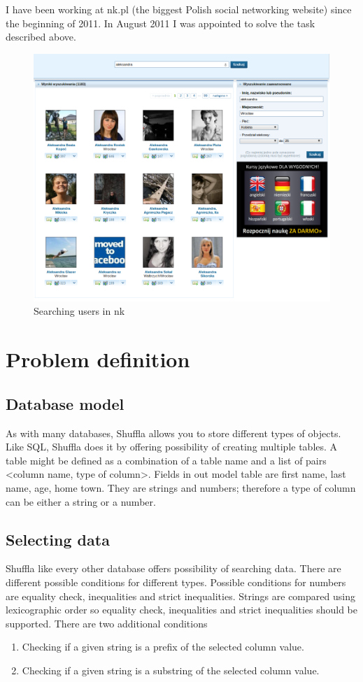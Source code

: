 \documentclass[10pt,a4paper]{article}
\begin{document}
I have been working at nk.pl (the biggest Polish social networking website) since the beginning of 2011. In August 2011 I was appointed to solve the task described above. 

\begin{figure}[h!]
\centering
  \includegraphics[width=12cm]{nk_search}
  \caption{Searching users in nk}
  \label{fig:nk_search}
\end{figure}

\section{Problem definition}

\subsection{Database model}

As with many databases, Shuffla allows you to store different types of objects. Like SQL, Shuffla does it by offering possibility of creating multiple tables. A table might be defined as a combination of a table name and a list of pairs <column name, type of column>. Fields in out model table are first name, last name, age, home town. They are strings and numbers; therefore a type of column can be either a string or a number.

\subsection{Selecting data}

Shuffla like every other database offers possibility of searching data. There are different possible conditions for different types. Possible conditions for numbers are equality check, inequalities and strict inequalities. Strings are compared using lexicographic order so equality check, inequalities and strict inequalities should be supported. There are two additional conditions
\begin{enumerate}
\item Checking if a given string is a prefix of the selected column value.
\item Checking if a given string is a substring of the selected column value. 
\end{enumerate}
\end{document}
